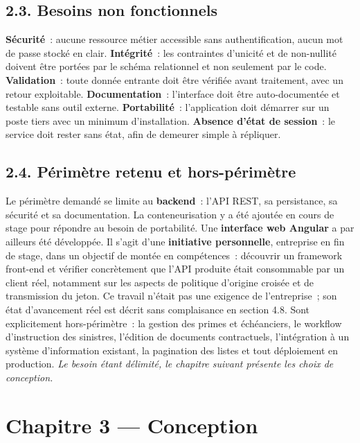 \documentclass[12pt,a4paper]{report}
\begin{document}
\section*{2.3. Besoins non fonctionnels}
\textbf{Sécurité}~: aucune ressource métier accessible sans authentification, aucun mot de passe stocké en clair. \textbf{Intégrité}~: les contraintes d'unicité et de non-nullité doivent être portées par le schéma relationnel et non seulement par le code. \textbf{Validation}~: toute donnée entrante doit être vérifiée avant traitement, avec un retour exploitable. \textbf{Documentation}~: l'interface doit être auto-documentée et testable sans outil externe. \textbf{Portabilité}~: l'application doit démarrer sur un poste tiers avec un minimum d'installation. \textbf{Absence d'état de session}~: le service doit rester sans état, afin de demeurer simple à répliquer.
\section*{2.4. Périmètre retenu et hors-périmètre}
Le périmètre demandé se limite au \textbf{backend}~: l'API REST, sa persistance, sa sécurité et sa documentation. La conteneurisation y a été ajoutée en cours de stage pour répondre au besoin de portabilité.
Une \textbf{interface web Angular} a par ailleurs été développée. Il s'agit d'une \textbf{initiative personnelle}, entreprise en fin de stage, dans un objectif de montée en compétences~: découvrir un framework front-end et vérifier concrètement que l'API produite était consommable par un client réel, notamment sur les aspects de politique d'origine croisée et de transmission du jeton. Ce travail n'était pas une exigence de l'entreprise~; son état d'avancement réel est décrit sans complaisance en section 4.8.
Sont explicitement hors-périmètre~: la gestion des primes et échéanciers, le workflow d'instruction des sinistres, l'édition de documents contractuels, l'intégration à un système d'information existant, la pagination des listes et tout déploiement en production.
\textit{Le besoin étant délimité, le chapitre suivant présente les choix de conception.}
\newpage
\chapter*{Chapitre 3 — Conception}
\end{document}
